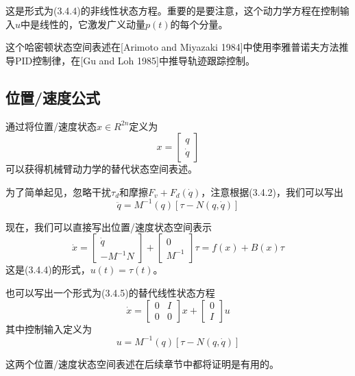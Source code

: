 \documentclass[12pt,a4paper]{ctexart}
\begin{document}
这是形式为(3.4.4)的非线性状态方程。重要的是要注意，这个动力学方程在控制输入$u$中是线性的，它激发广义动量$p(t)$的每个分量。

这个哈密顿状态空间表述在[Arimoto and Miyazaki 1984]中使用李雅普诺夫方法推导PID控制律，在[Gu and Loh 1985]中推导轨迹跟踪控制。

\subsection{位置/速度公式}

通过将位置/速度状态$x \in R^{2n}$定义为
\begin{equation}
x = \begin{bmatrix} q \\ \dot{q} \end{bmatrix}
\end{equation}
可以获得机械臂动力学的替代状态空间表述。

为了简单起见，忽略干扰$\tau_d$和摩擦$F_v + F_d(\dot{q})$，注意根据(3.4.2)，我们可以写出
\begin{equation}
\ddot{q} = M^{-1}(q)[\tau - N(q,\dot{q})]
\end{equation}

现在，我们可以直接写出位置/速度状态空间表示
\begin{equation}
\dot{x} = \begin{bmatrix} \dot{q} \\ -M^{-1}N \end{bmatrix} + \begin{bmatrix} 0 \\ M^{-1} \end{bmatrix}\tau = f(x) + B(x)\tau
\end{equation}
这是(3.4.4)的形式，$u(t) = \tau(t)$。

也可以写出一个形式为(3.4.5)的替代线性状态方程
\begin{equation}
\dot{x} = \begin{bmatrix} 0 & I \\ 0 & 0 \end{bmatrix}x + \begin{bmatrix} 0 \\ I \end{bmatrix}u
\end{equation}
其中控制输入定义为
\begin{equation}
u = M^{-1}(q)[\tau - N(q,\dot{q})]
\end{equation}

这两个位置/速度状态空间表述在后续章节中都将证明是有用的。
\end{document}

